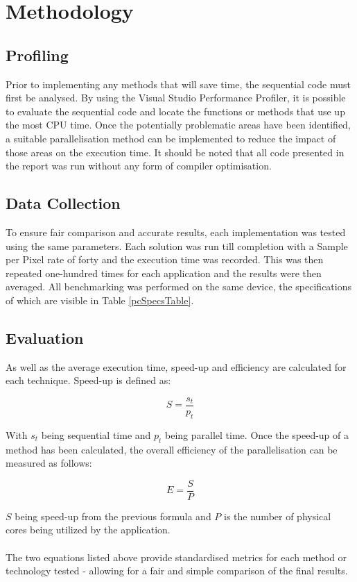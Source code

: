 \documentclass[journal,transmag]{IEEEtran}
\begin{document}
\section{Methodology}
	
	\subsection{Profiling}
		Prior to implementing any methods that will save time, the sequential code must first be analysed. By using the Visual Studio Performance Profiler, it is possible to evaluate the sequential code and locate the functions or methods that use up the most CPU time. Once the potentially problematic areas have been identified, a suitable parallelisation method can be implemented to reduce the impact of those areas on the execution time. It should be noted that all code presented in the report was run without any form of compiler optimisation.
		
	\subsection{Data Collection}
		To ensure fair comparison and accurate results, each implementation was tested using the same parameters. Each solution was run till completion with a Sample per Pixel rate of forty and the execution time was recorded. This was then repeated one-hundred times for each application and the results were then averaged. All benchmarking was performed on the same device, the specifications of which are visible in Table \ref{pcSpecsTable}. 
		
	\subsection{Evaluation}
		As well as the average execution time, speed-up and efficiency are calculated for each technique. Speed-up is defined as: 
		
		\[S=\frac{s_{t}}{p_{t}}\]
		
		\noindent With \(s_{t}\) being sequential time and \(p_{t}\) being parallel time.
		Once the speed-up of a method has been calculated, the overall efficiency of the parallelisation can be measured as follows:
		
		\[E = \frac{S}{P}\]
		
		\noindent \(S\) being speed-up from the previous formula and \(P\) is the number of physical cores being utilized by the application.
		\\\\The two equations listed above provide standardised metrics for each method or technology tested - allowing for a fair and simple comparison of the final results.
		
\end{document}

